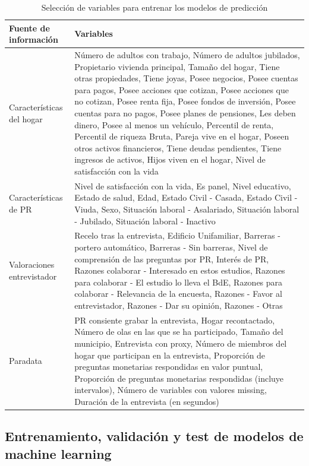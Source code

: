 \begin{table}[htbp]
\centering{}
\begin{tabular}{l p{10cm}}
\hline
\textbf{Fuente de información} & \textbf{Variables} \\ \hline
Características del hogar & Número de adultos con trabajo, Número de adultos jubilados, Propietario vivienda principal, Tamaño del hogar, Tiene otras propiedades, Tiene joyas, Posee negocios, Posee cuentas para pagos, Posee acciones que cotizan, Posee acciones que no cotizan, Posee renta fija, Posee fondos de inversión, Posee cuentas para no pagos, Posee planes de pensiones, Les deben dinero, Posee al menos un vehículo, Percentil de renta, Percentil de riqueza Bruta, Pareja vive en el hogar, Poseen otros activos financieros, Tiene deudas pendientes, Tiene ingresos de activos, Hijos viven en el hogar, Nivel de satisfacción con la vida \\ \hline
Características de PR & Nivel de satisfacción con la vida, Es panel, Nivel educativo, Estado de salud, Edad, Estado Civil - Casada, Estado Civil - Viuda, Sexo, Situación laboral - Asalariado, Situación laboral - Jubilado, Situación laboral - Inactivo \\ \hline
Valoraciones entrevistador & Recelo tras la entrevista, Edificio Unifamiliar, Barreras - portero automático, Barreras - Sin barreras, Nivel de comprensión de las preguntas por PR, Interés de PR, Razones colaborar - Interesado en estos estudios, Razones para colaborar - El estudio lo lleva el BdE, Razones para colaborar - Relevancia de la encuesta, Razones - Favor al entrevistador, Razones - Dar su opinión, Razones - Otras \\ \hline
Paradata & PR consiente grabar la entrevista, Hogar recontactado, Número de olas en las que se ha participado, Tamaño del municipio, Entrevista con proxy, Número de miembros del hogar que participan en la entrevista, Proporción de preguntas monetarias respondidas en valor puntual, Proporción de preguntas monetarias respondidas (incluye intervalos), Número de variables con valores missing, Duración de la entrevista (en segundos) \\ \hline
\end{tabular}
\caption{Selección de variables para entrenar los modelos de predicción}
\label{table:vars}
\end{table}

\subsection*{Entrenamiento, validación y test de modelos de machine learning}

